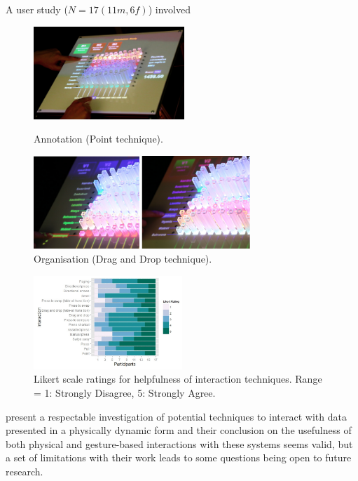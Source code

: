 \documentclass[11pt]{article}
\begin{document}
A user study ($N=17 (11m, 6f)$) involved 

\begin{figure}[H]
\centering
  \includegraphics[height=3.5cm]{img/taher2015-annotation.png}
  \caption{Annotation (Point technique).}\label{fig:taher2015-annotation}
\endminipage\hfill
{}%
\centering
  \includegraphics[height=3.5cm]{img/taher2015-organize.png}
  \caption{Organisation (Drag and Drop technique).}\label{fig:taher2015-organize}
\endminipage
\end{figure}

\begin{figure}[H]
\centering
\includegraphics[width=0.5\textwidth]{img/taher2015-likert.png} 
\caption{Likert scale ratings for helpfulness of interaction
techniques. Range = 1: Strongly Disagree, 5: Strongly Agree.}\label{fig:taher2015-likert}
\end{figure}

\citet{taher2015} present a respectable investigation of potential techniques to interact with data presented in a physically dynamic form and their conclusion on the usefulness of both physical and gesture-based interactions with these systems seems valid, but a set of limitations with their work leads to some questions being open to future research. 
\end{document}
